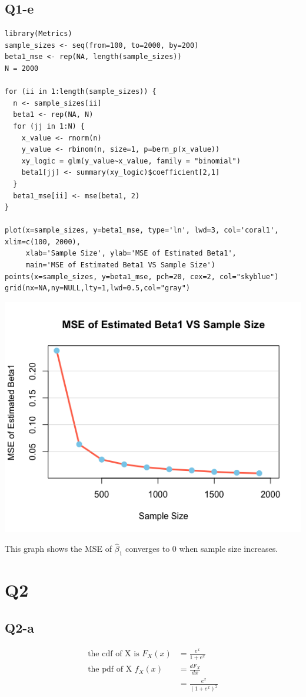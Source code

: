 \documentclass[12pt,letterpaper]{article}
\let\hat\widehat
\begin{document}
\subsection*{Q1-e}
\begin{verbatim}
library(Metrics)
sample_sizes <- seq(from=100, to=2000, by=200)
beta1_mse <- rep(NA, length(sample_sizes))
N = 2000

for (ii in 1:length(sample_sizes)) {
  n <- sample_sizes[ii]
  beta1 <- rep(NA, N)
  for (jj in 1:N) {
    x_value <- rnorm(n)
    y_value <- rbinom(n, size=1, p=bern_p(x_value))
    xy_logic = glm(y_value~x_value, family = "binomial")
    beta1[jj] <- summary(xy_logic)$coefficient[2,1]
  }
  beta1_mse[ii] <- mse(beta1, 2)
}

plot(x=sample_sizes, y=beta1_mse, type='ln', lwd=3, col='coral1', xlim=c(100, 2000),
     xlab='Sample Size', ylab='MSE of Estimated Beta1', 
     main='MSE of Estimated Beta1 VS Sample Size')
points(x=sample_sizes, y=beta1_mse, pch=20, cex=2, col="skyblue")
grid(nx=NA,ny=NULL,lty=1,lwd=0.5,col="gray")
\end{verbatim}

\includegraphics[width=150mm]{mse_samplesize.png}

\noindent This graph shows the MSE of $\hat{\beta}_1$ converges to 0 when sample size increases.

\newpage
\section*{Q2}
\subsection*{Q2-a}
\begin{align*}
\text{the cdf of X is }F_X(x) &= \frac{e^x}{1+e^x} \\
\text{the pdf of X } f_X(x) &= \frac{d F_X}{dx} \\
&= \frac{e^x}{(1 + e^x)^2}
\end{align*}
\end{document}
